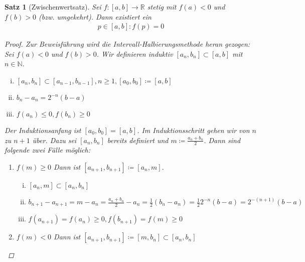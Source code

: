 \documentclass[ngerman,titlepage,twoside, parskip=half*]{scrreprt}
\newcommand*{\N}{\mathbb{N}}
\newcommand*{\R}{\mathbb{R}}
\theoremstyle{break}
\newtheorem{theorem}{Satz}[section]
\theoremstyle{nonumberbreak}
\newtheorem{proof}{Beweis:}
\begin{document}
\begin{theorem}[Zwischenwertsatz]\label{satz:zws}
  Sei $f\colon[a,b]\rightarrow \R$ stetig mit $f(a)<0$ und $f(b)>0$
  (bzw. umgekehrt). Dann existiert ein
  \begin{gather*}
    p\in[a,b]\colon f(p)=0
  \end{gather*}
  \begin{proof}
    Zur Beweisführung wird die Intervall-Halbierungsmethode heran
    gezogen: Sei $f(a)<0$ und $f(b)>0$. Wir definieren induktiv
    $[a_n,b_n]\subset [a,b]$ mit  $n\in \N$.
    \begin{enumerate}[(i)]
    \item $[a_n,b_n]\subset [a_{n-1},b_{n-1}], n\geq 1, [a_0,b_0]\coloneqq[a,b]$
    \item $b_n-a_n=2^{-n}(b-a)$
    \item $f(a_n)\leq 0, f(b_n)\geq 0$
    \end{enumerate}
    Der Induktionsanfang ist $[a_0,b_0]=[a,b]$. Im Induktionsschritt
    gehen wir von  $n$ zu $n+1$ über. Dazu sei $[a_n,b_n]$ bereits
    definiert und $m\coloneqq\frac{a_n+b_n}{2}$. Dann sind folgende
    zwei Fälle möglich:
    \begin{enumerate}[1.\,F{a}ll]
    \item $f(m)\geq 0$ Dann ist $[a_{n+1},b_{n+1}]\coloneqq[a_n,m]$.
    \begin{enumerate}[(i)]
    \item $[a_{n},m]\subset [a_{n}, b_{n}]$
    \item $b_{n+1}-a_{n+1} = m-a_n = \frac{a_n+b_n}{2}-a_n =
      \frac{1}{2}(b_n-a_n) = \frac{1}{2}2^{-n}(b-a)=2^{-(n+1)}(b-a)$
    \item $f(a_{n+1})=f(a_n)\geq 0, f(b_{n+1})=f(m)\geq 0$
    \end{enumerate}
  \item $f(m)<0$ Dann ist $[a_{n+1},b_{n+1}]\coloneqq[m,b_{n}]\subset [a_n,b_n]$

\end{enumerate}
\end{proof}
\end{theorem}
\end{document}
